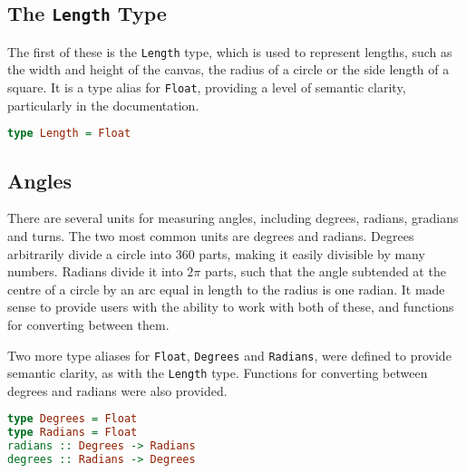 \documentclass[../main.tex]{subfiles}
\begin{document}
        \subsection{The \texttt{Length}
            Type} The first of these is the \texttt{Length} type, which is used to
                represent lengths, such as the width and height of the canvas, the radius of a
                circle or the side length of a square.
            It is a type alias for \texttt{Float}, providing a level of semantic clarity,
                particularly in the documentation.
            \begin{lstlisting}[language={Haskell}, label={lst:length}, caption={The \texttt{Length} 
                type definition.}]
type Length = Float\end{lstlisting}

        \subsection{Angles}
            There are several units for measuring angles, including degrees, radians,
                gradians and turns.
            The two most common units are degrees and radians.
            Degrees arbitrarily divide a circle into 360 parts, making it easily divisible
                by many numbers.
            Radians divide it into $2\pi$ parts, such that the angle subtended at the
                centre of a circle by an arc equal in length to the radius is one radian.
            It made sense to provide users with the ability to work with both of these, and
                functions for converting between them.

            Two more type aliases for \texttt{Float}, \texttt{Degrees} and
                \texttt{Radians}, were defined to provide semantic clarity, as with the
                \texttt{Length} type.
            Functions for converting between degrees and radians were also provided.

            \begin{lstlisting}[language={Haskell}, label={lst:angleFns}, caption={The angle functions.}]  
type Degrees = Float
type Radians = Float                
radians :: Degrees -> Radians
degrees :: Radians -> Degrees\end{lstlisting}
\end{document}
